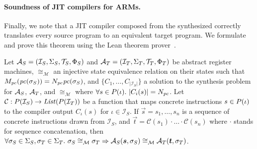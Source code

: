 \paragraph{Soundness of JIT compilers for ARMs.} Finally, we note that a JIT
compiler composed from the synthesized \minicompilers correctly
translates every source program to an equivalent target program.
We formulate and prove this theorem using the Lean theorem prover~\cite{moura:lean}.

\begin{theorem}\label{thm:end-to-end-soundness}
Let $\mathcal{A}_S = (\mathcal{I}_S, \Sigma_S, \mathcal{T}_S, \Phi_S)$ and
$\mathcal{A}_T=(\mathcal{I}_T, \Sigma_T,  \mathcal{T}_T, \Phi_T)$ be abstract register
machines, $\cong_\mathcal{M}$ an injective state equivalence relation on their
states such that $M_\mathit{pc}(\mathit{pc}(\sigma_S)) = N_\mathit{pc}\mathit{pc}(\sigma_S)$,
and $\{C_1,\ldots,C_{|\mathcal{I}_S|}\}$ a solution to the \minicompiler
synthesis problem for $\mathcal{A}_S$, $\mathcal{A}_T$, and $\cong_\mathcal{M}$
where $\forall s\in P(\iota).\ |C_i(s)| = N_\mathit{pc}$. Let
$\mathcal{C} : P(\mathcal{I}_S) \rightarrow
\mathit{List}(P(\mathcal{I}_T))$ be a function that maps concrete
instructions $s\in P(\iota)$ to the compiler output $C_\iota(s)$ for
$\iota\in\mathcal{I}_S$. If $\vec{s} = s_1, \ldots, s_n$ is a sequence of
concrete instructions drawn from $\mathcal{I}_S$, and $\vec{t} =
\mathcal{C}(s_1)\cdot\ldots\cdot\mathcal{C}(s_n)$ where $\cdot$ stands for
sequence concatenation, then $\forall \sigma_S\in\Sigma_S, \sigma_T\in\Sigma_T.\
\sigma_S \cong_\mathcal{M} \sigma_T \Rightarrow \mathcal{A}_S(\boldsymbol{s}, \sigma_S)
\cong_\mathcal{M} \mathcal{A}_T(\boldsymbol{t}, \sigma_T)$.\tighten
\end{theorem}
